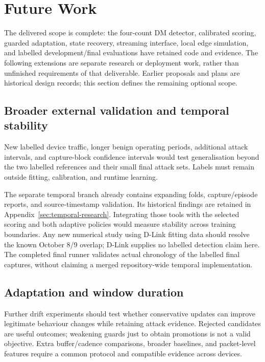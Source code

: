 \section{Future Work}
\label{sec:future-work}

The delivered scope is complete: the four-count DM detector, calibrated scoring,
guarded adaptation, state recovery, streaming interface, local edge simulation,
and labelled development/final evaluations have retained code and evidence.
The following extensions are separate research or deployment work, rather than
unfinished requirements of that deliverable. Earlier proposals and plans are
historical design records; this section defines the remaining optional scope.

\subsection{Broader external validation and temporal stability}

New labelled device traffic, longer benign operating periods, additional attack
intervals, and capture-block confidence intervals would test generalisation
beyond the two labelled references and their small final attack sets. Labels
must remain outside fitting, calibration, and runtime learning.

The separate temporal branch already contains expanding folds, capture/episode
reports, and source-timestamp validation. Its historical findings are retained
in Appendix~\ref{sec:temporal-research}. Integrating those tools with the selected
scoring and both adaptive policies would measure stability across training
boundaries. Any new numerical study using D-Link fitting data should resolve
the known October 8/9 overlap; D-Link supplies no labelled detection claim here.
The completed final runner validates actual chronology of the labelled final
captures, without claiming a merged repository-wide temporal implementation.

\subsection{Adaptation and window duration}

Further drift experiments should test whether conservative updates can improve
legitimate behaviour changes while retaining attack evidence. Rejected candidates
are useful outcomes; weakening guards just to obtain promotions is not a valid
objective. Extra buffer/cadence comparisons, broader baselines, and packet-level
features require a common protocol and compatible evidence across devices.

